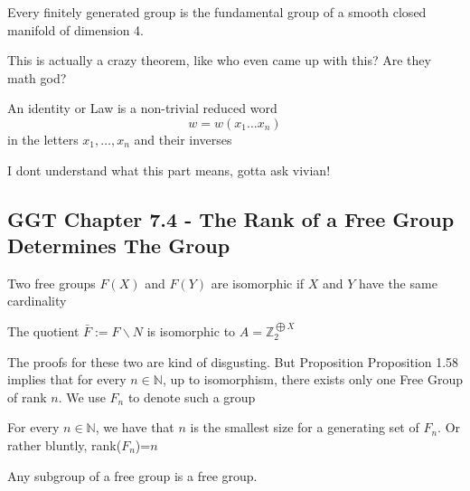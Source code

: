 \begin{theorem}
    Every finitely generated group is the fundamental group of a smooth closed manifold of dimension 4.
\end{theorem}
This is actually a crazy theorem, like who even came up with this? Are they math god?
\begin{definition}
    An identity or Law is a non-trivial reduced word
    \[w=w(x_1\ldots x_n)\]
    in the letters $x_1,\ldots,x_n$ and their inverses
\end{definition}
I dont understand what this part means, gotta ask vivian!
\subsection{GGT Chapter 7.4 - The Rank of a Free Group Determines The Group}
\begin{proposition}
    Two free groups $F(X)$ and $F(Y)$ are isomorphic if $X$ and $Y$ have the same cardinality
\end{proposition}
\begin{lemma}
    The quotient $\bar{F} := F\backslash N$ is isomorphic to $A=\mathbb{Z}_2^{\bigoplus X}$
\end{lemma}
The proofs for these two are kind of disgusting. But Proposition Proposition 1.58 implies that for every $n\in\mathbb{N}$, up to isomorphism, there exists only one Free Group of rank $n$. We use $F_n$ to denote such a group
\begin{corollary}
    For every $n\in\mathbb{N}$, we have that $n$ is the smallest size for a generating set of $F_n$. Or rather bluntly, rank($F_n$)=$n$
\end{corollary}
\begin{theorem}
    Any subgroup of a free group is a free group.

\end{theorem}
